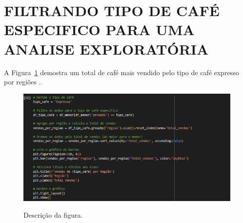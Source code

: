 \section{FILTRANDO TIPO DE CAFÉ ESPECIFICO PARA UMA ANALISE EXPLORATÓRIA}
	\label{sec:identificao}
\label{sec:figura}
A Figura~\ref{figuras/configuraçao-cafe-expresso-regiao.png} demostra um total de café mais vendido pelo tipo de café expresso por regiões .
\begin{figure}[!ht]
	{\centering
		\caption{Descrição da figura.}
		\includegraphics[width=1.0\textwidth]{figuras/configuraçao-cafe-expresso-regiao.png}
		\label{figuras/configuraçao-cafe-expresso-regiao.png}
	}
\end{figure} \\ \\ \\ \\ \\ \\ \\  \\ \\ \\ \\ \\ 

